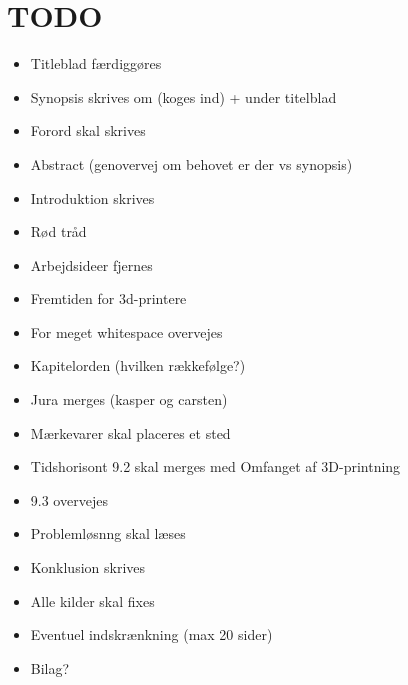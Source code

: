 \chapter{TODO} %
\label{cha:todo}

\begin{itemize}
	\item Titleblad færdiggøres
	\item Synopsis skrives om (koges ind) + under titelblad
	\item Forord skal skrives
	\item Abstract (genovervej om behovet er der vs synopsis)
	\item Introduktion skrives 
	\item Rød tråd
	\item Arbejdsideer fjernes
	\item Fremtiden for 3d-printere
	\item For meget whitespace overvejes
	\item Kapitelorden (hvilken rækkefølge?)
	\item Jura merges (kasper og carsten)
	\item Mærkevarer skal placeres et sted
	\item Tidshorisont 9.2 skal merges med Omfanget af 3D-printning
	\item 9.3 overvejes
	\item Problemløsnng skal læses
	\item Konklusion skrives
	\item Alle kilder skal fixes
	\item Eventuel indskrænkning (max 20 sider)
	\item Bilag?
\end{itemize}


